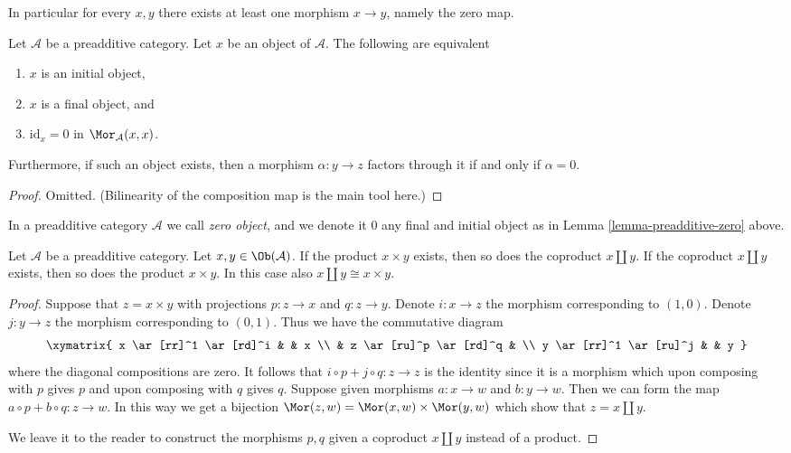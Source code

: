 \noindent
In particular for every $x, y$ there exists at least
one morphism $x \to y$, namely the zero map.

\begin{lemma}
\label{lemma-preadditive-zero}
Let $\mathcal{A}$ be a preadditive category.
Let $x$ be an object of $\mathcal{A}$.
The following are equivalent
\begin{enumerate}
\item $x$ is an initial object,
\item $x$ is a final object, and
\item $\text{id}_x = 0$ in $\Mor_\mathcal{A}(x, x)$.
\end{enumerate}

Furthermore, if such an object exists, then a morphism
$\alpha : y \to z$ factors through it if and only if $\alpha = 0$.
\end{lemma}

\begin{proof}
Omitted.
(Bilinearity of the composition map is the main tool here.)
\end{proof}

\begin{definition}
\label{definition-zero-object}
In a preadditive category $\mathcal{A}$ we call
{\it zero object}, and we denote it $0$
any final and initial object as in Lemma \ref{lemma-preadditive-zero} above.
\end{definition}

\begin{lemma}
\label{lemma-preadditive-direct-sum}
Let $\mathcal{A}$ be a preadditive category.
Let $x, y \in \Ob(\mathcal{A})$.
If the product $x \times y$ exists, then so does
the coproduct $x \amalg y$.
If the coproduct $x \amalg y$ exists, then so does
the product $x \times y$. In this case
also $x \amalg y \cong x \times y$.
\end{lemma}

\begin{proof}
Suppose that $z = x \times y$ with projections
$p : z \to x$ and $q : z \to y$. Denote $i : x \to z$
the morphism corresponding to $(1, 0)$. Denote $j : y \to z$
the morphism corresponding to $(0, 1)$. Thus we have the
commutative diagram
$$
\xymatrix{
x \ar[rr]^1 \ar[rd]^i & & x \\
& z \ar[ru]^p \ar[rd]^q & \\
y \ar[rr]^1 \ar[ru]^j & & y
}
$$
where the diagonal compositions are zero. It follows that
$i \circ p + j \circ q : z \to z$ is the identity since
it is a morphism which upon composing with $p$ gives $p$
and upon composing with $q$ gives $q$.
Suppose given morphisms $a : x \to w$ and $b : y \to w$.
Then we can form the map $a \circ p + b \circ q : z \to w$.
In this way we get a bijection $\Mor(z, w)
= \Mor(x, w) \times \Mor(y, w)$ which
show that $z = x \amalg y$.

\medskip\noindent
We leave it to the reader to construct the morphisms
$p, q$ given a coproduct $x \amalg y$ instead of a
product.
\end{proof}

